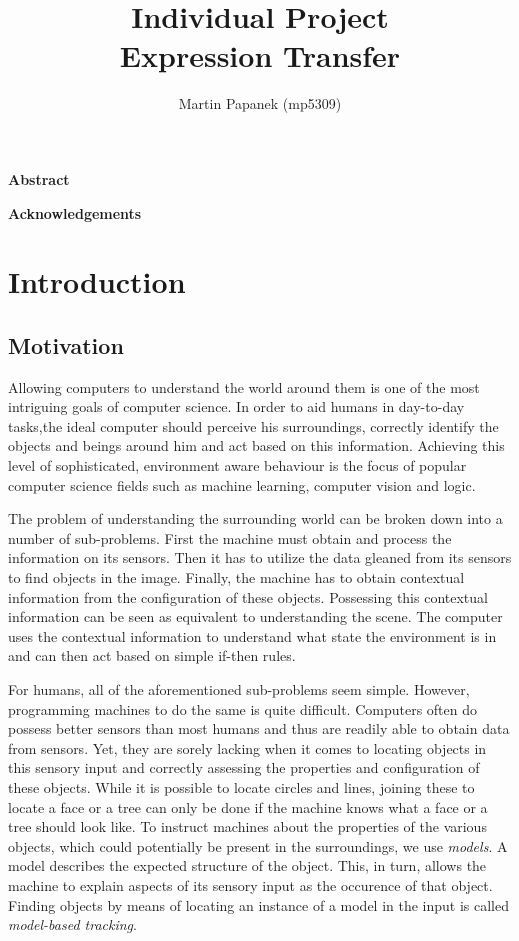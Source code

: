 \documentclass[11pt,a4paper]{book}
\title{Individual Project\\Expression Transfer}
\author{Martin Papanek (mp5309)}
\date{}
\begin{document}
\maketitle

\begin{center}
\LARGE \textbf{Abstract}
\end{center}

\newpage

\begin{center}
\LARGE \textbf{Acknowledgements}
\end{center}


\newpage

\tableofcontents
\listoftables

\chapter{Introduction}
\section{Motivation}
Allowing computers to understand the world around them is one of the most
intriguing goals of computer science. In order to aid humans in day-to-day
tasks,the ideal computer should perceive his surroundings, correctly identify the objects and beings around him and act based
on this information. Achieving this level of sophisticated, environment aware
behaviour is the focus of popular computer science fields such as machine
learning, computer vision and logic.

The problem of understanding the surrounding world can be broken down into a
number of sub-problems. First the machine must obtain and process the information on
its sensors. Then it has to utilize the data gleaned from its sensors to find
objects in the image. Finally, the machine has to obtain contextual information
from the configuration of these objects. Possessing this contextual information can be seen
as equivalent to understanding the scene. The computer uses the contextual
information to understand what state the environment is in and can then act based on
simple if-then rules.

For humans, all of the aforementioned sub-problems seem simple. However, programming
machines to do the same is quite difficult. Computers often do
possess better sensors than most humans and thus are readily able to obtain data
from sensors. Yet, they are sorely lacking when it comes to locating objects
in this sensory input and correctly assessing the properties and configuration
of these objects. While it is possible to locate circles and lines, joining
these to locate a face or a tree can only be done if the machine knows what a
face or a tree should look like. To instruct machines about the properties of
the various objects, which could potentially be present in the surroundings, we
use \textit{models}. A model describes the expected structure of the object.
This, in turn, allows the machine to explain aspects of its sensory input as the
occurence of that object. Finding objects by means of locating an instance of a
model in the input is called \textit{model-based tracking}.
\end{document}

